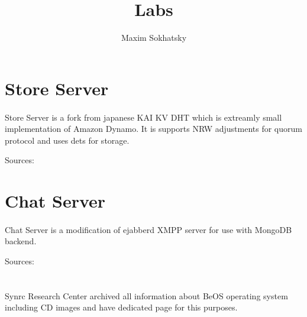 \documentclass[11pt]{article}
\begin{document}
\title{Labs}
\author{Maxim Sokhatsky}


\section*{Store Server}
\paragraph{}
Store Server is a fork from japanese KAI KV DHT which is
extreamly small implementation of Amazon Dynamo. It is supports 
NRW adjustments for quorum protocol and uses dets for storage.

Sources: 

\section*{Chat Server}
\paragraph{}
Chat Server is a modification of ejabberd XMPP server for use with MongoDB backend.

Sources: 

\section*{}
\paragraph{}
Synrc Research Center archived all information about BeOS operating system 
including CD images and have dedicated page for this purposes.


\end{document}
